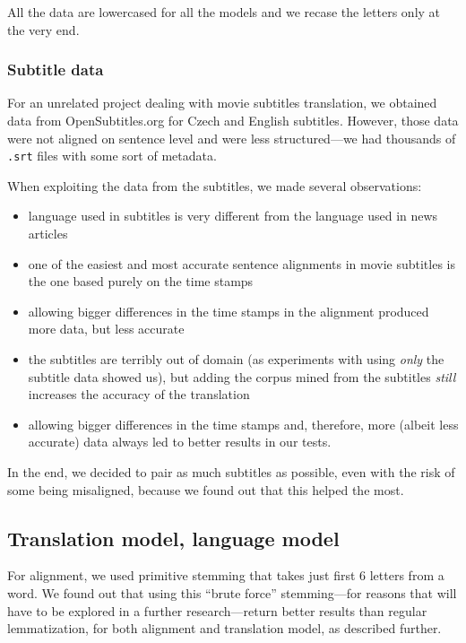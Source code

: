 \documentclass[11pt,letterpaper]{article}
\begin{document}
All the data are lowercased for all the models and we recase the letters only at the very end.

\subsubsection{Subtitle data}
For an unrelated project dealing with movie subtitles translation, we obtained data from OpenSubtitles.org for Czech and English subtitles. However, those data were not aligned on sentence level and were less structured---we had thousands of \texttt{.srt} files with some sort of metadata.

When exploiting the data from the subtitles, we made several observations:
\begin{itemize}
\item language used in subtitles is very different from the language used in news articles%
\item one of the easiest and most accurate sentence alignments in movie subtitles is the one based purely on the time stamps
\item allowing bigger differences in the time stamps in the alignment produced more data, but less accurate
\item the subtitles are terribly out of domain (as experiments with using \emph{only} the subtitle data showed us), but adding the corpus mined from the subtitles \emph{still} increases the accuracy of the translation
\item allowing bigger differences in the time stamps and, therefore, more (albeit less accurate) data always led to better results in our tests.
\end{itemize}

In the end, we decided to pair as much subtitles as possible, even with the risk of some being misaligned, because we found out that this helped the most.


\subsection{Translation model, language model}
For alignment, we used primitive stemming that takes just first 6 letters from a word. We found out that using this ``brute force'' stemming---for reasons that will have to be explored in a further research---return better results than regular lemmatization, for both alignment and translation model, as described further.
\end{document}
